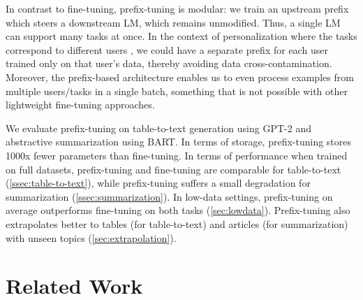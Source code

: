 \documentclass[11pt,a4paper]{article}
\newcommand\pl[1]{\textcolor{red}{[PL: #1]}}
\begin{document}
In contrast to fine-tuning, prefix-tuning is modular: we train an upstream prefix which steers a downstream LM, which remains unmodified.
Thus, a single LM can support many tasks at once.
In the context of personalization where the tasks correspond to different users \cite{Shokri-Shmatikov-2015, McMahan-et-al-2016},
we could have a separate prefix for each user trained only on that user's data,
thereby avoiding data cross-contamination.
Moreover, the prefix-based architecture enables us to even process examples from multiple users/tasks in a single batch,
something that is not possible with other lightweight fine-tuning approaches.




We evaluate prefix-tuning on table-to-text generation using GPT-2 and abstractive summarization using BART. In terms of storage, prefix-tuning  stores 1000x fewer parameters than fine-tuning. In terms of performance when trained on full datasets, prefix-tuning and fine-tuning are comparable for table-to-text (\cref{ssec:table-to-text}), while prefix-tuning suffers a small degradation for summarization (\cref{ssec:summarization}). In low-data settings, prefix-tuning on average outperforms fine-tuning on both tasks (\cref{sec:lowdata}). %
Prefix-tuning also extrapolates better to tables (for table-to-text) and articles (for summarization) with unseen topics (\cref{sec:extrapolation}). 

\section{Related Work}


\label{sec:related_work}
\end{document}
